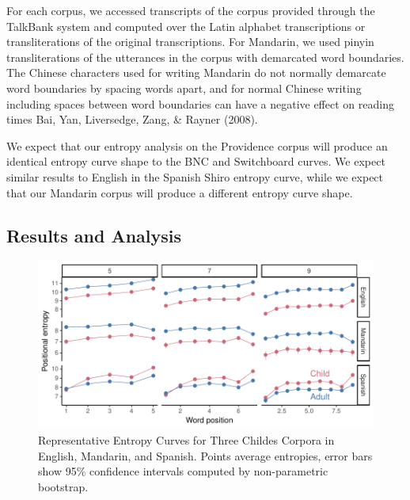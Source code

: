 \documentclass[10pt, letterpaper]{article}
\newenvironment{CodeChunk}{}{}
\begin{document}
For each corpus, we accessed transcripts of the corpus provided through
the TalkBank system and computed over the Latin alphabet transcriptions
or transliterations of the original transcriptions. For Mandarin, we
used pinyin transliterations of the utterances in the corpus with
demarcated word boundaries. The Chinese characters used for writing
Mandarin do not normally demarcate word boundaries by spacing words
apart, and for normal Chinese writing including spaces between word
boundaries can have a negative effect on reading times Bai, Yan,
Liversedge, Zang, \& Rayner (2008).

We expect that our entropy analysis on the Providence corpus will
produce an identical entropy curve shape to the BNC and Switchboard
curves. We expect similar results to English in the Spanish Shiro
entropy curve, while we expect that our Mandarin corpus will produce a
different entropy curve shape.

\hypertarget{results-and-analysis-1}{%
\subsection{Results and Analysis}\label{results-and-analysis-1}}

\begin{CodeChunk}
\begin{figure}[tb]

{\centering \includegraphics{figs/plot_childes-1} 

}

\caption[Representative Entropy Curves for Three Childes Corpora in English, Mandarin, and Spanish]{Representative Entropy Curves for Three Childes Corpora in English, Mandarin, and Spanish. Points average entropies, error bars show 95\% confidence intervals computed by non-parametric bootstrap.}\label{fig:plot_childes}
\end{figure}
\end{CodeChunk}
\end{document}
